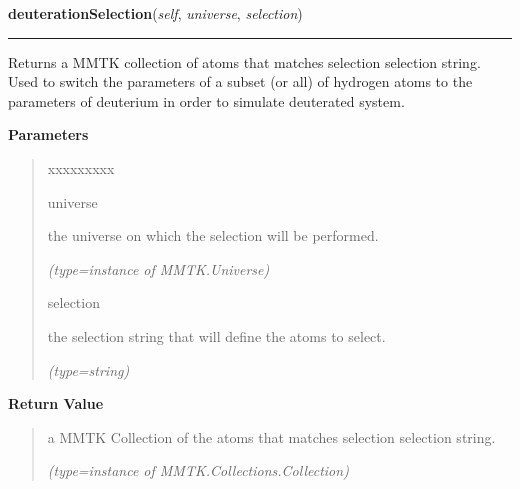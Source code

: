     \label{nMOLDYN:Analysis:Analysis:Analysis:deuterationSelection}

    \vspace{0.5ex}

\hspace{.8\funcindent}\begin{boxedminipage}{\funcwidth}

    \raggedright \textbf{deuterationSelection}(\textit{self}, \textit{universe}, \textit{selection})

    \vspace{-1.5ex}

    \rule{\textwidth}{0.5\fboxrule}
\setlength{\parskip}{2ex}
    Returns a MMTK collection of atoms that matches 
    {\textbar}selection{\textbar} selection string. Used to switch the 
    parameters of a subset (or all) of hydrogen atoms to the parameters of 
    deuterium in order to simulate deuterated system.

\setlength{\parskip}{1ex}
      \textbf{Parameters}
      \vspace{-1ex}

      \begin{quote}
        \begin{Ventry}{xxxxxxxxx}

          \item[universe]

          the universe on which the selection will be performed.

            {\it (type=instance of MMTK.Universe)}

          \item[selection]

          the selection string that will define the atoms to select.

            {\it (type=string)}

        \end{Ventry}

      \end{quote}

      \textbf{Return Value}
    \vspace{-1ex}

      \begin{quote}
      a MMTK Collection of the atoms that matches 
      {\textbar}selection{\textbar} selection string.

      {\it (type=instance of MMTK.Collections.Collection)}

      \end{quote}

    \end{boxedminipage}

